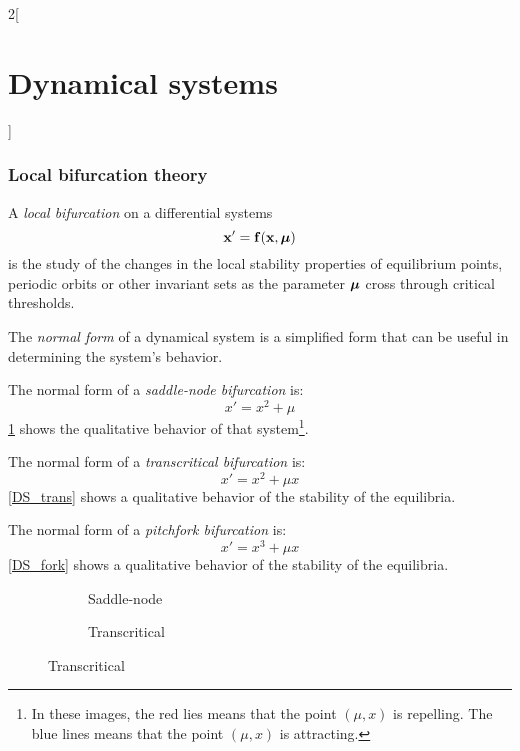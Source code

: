 \documentclass[../../../main_math.tex]{subfiles}
\begin{document}
\begin{multicols}{2}[\section{Dynamical systems}]
  \subsubsection{Local bifurcation theory}
  \begin{definition}
    A \emph{local bifurcation} on a differential systems
    \begin{equation}\label{DS_mu-system}
      \boldsymbol{\mathrm{x}}'=\boldsymbol{\mathrm{f}}(\boldsymbol{\mathrm{x}},\boldsymbol{\mathrm{\mu}})
    \end{equation}
    is the study of the changes in the local stability properties of equilibrium points, periodic orbits or other invariant sets as the parameter $\boldsymbol{\mathrm{\mu}}$ cross through critical thresholds.
  \end{definition}
  \begin{definition}
    The \emph{normal form} of a dynamical system is a simplified form that can be useful in determining the system's behavior.
  \end{definition}
  \begin{definition}
    The normal form of a \emph{saddle-node bifurcation} is: $$x'=x^2+\mu$$
    \cref{DS_sn} shows the qualitative behavior of that system\footnote{In these images, the red lies means that the point $(\mu,x)$ is repelling. The blue lines means that the point $(\mu,x)$ is attracting.}.
  \end{definition}
  \begin{definition}
    The normal form of a \emph{transcritical bifurcation} is: $$x'=x^2+\mu x$$
    \cref{DS_trans} shows a qualitative behavior of the stability of the equilibria.
  \end{definition}
  \begin{definition}
    The normal form of a \emph{pitchfork bifurcation} is: $$x'=x^3+\mu x$$
    \cref{DS_fork} shows a qualitative behavior of the stability of the equilibria.
  \end{definition}
  \begin{figure}[H]
    \centering
    \begin{subfigure}[b]{0.32\linewidth}
      \centering
      
      \caption{Saddle-node}
      \label{DS_sn}
    \end{subfigure}
    \hfill
    \begin{subfigure}[b]{0.32\linewidth}
      \centering
      
      \caption{Transcritical}

\end{subfigure}
\end{figure}
\end{multicols}
\end{document}
